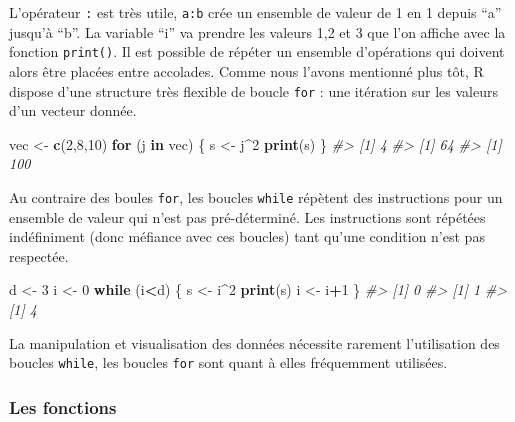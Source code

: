 \documentclass[]{article}
\newenvironment{Shaded}{\begin{snugshade}}{\end{snugshade}}
\newcommand{\CommentTok}[1]{\textcolor[rgb]{0.56,0.35,0.01}{\textit{#1}}}
\newcommand{\ControlFlowTok}[1]{\textcolor[rgb]{0.13,0.29,0.53}{\textbf{#1}}}
\newcommand{\DecValTok}[1]{\textcolor[rgb]{0.00,0.00,0.81}{#1}}
\newcommand{\KeywordTok}[1]{\textcolor[rgb]{0.13,0.29,0.53}{\textbf{#1}}}
\newcommand{\NormalTok}[1]{#1}
\newcommand{\OperatorTok}[1]{\textcolor[rgb]{0.81,0.36,0.00}{\textbf{#1}}}
\newcommand{\StringTok}[1]{\textcolor[rgb]{0.31,0.60,0.02}{#1}}
\begin{document}
L'opérateur \texttt{:} est très utile, \texttt{a:b} crée un ensemble de valeur de 1 en 1 depuis ``a'' jusqu'à ``b''. La variable ``i'' va prendre les valeurs 1,2 et 3 que l'on affiche avec la fonction \texttt{print()}. Il est possible de répéter un ensemble d'opérations qui doivent alors être placées entre accolades.
Comme nous l'avons mentionné plus tôt, R dispose d'une structure très flexible de boucle \texttt{for} : une itération sur les valeurs d'un vecteur donnée.

\begin{Shaded}
\begin{Highlighting}[]
\NormalTok{vec <-}\StringTok{ }\KeywordTok{c}\NormalTok{(}\DecValTok{2}\NormalTok{,}\DecValTok{8}\NormalTok{,}\DecValTok{10}\NormalTok{)}
\ControlFlowTok{for}\NormalTok{ (j }\ControlFlowTok{in}\NormalTok{ vec) \{}
\NormalTok{  s <-}\StringTok{ }\NormalTok{j}\OperatorTok{^}\DecValTok{2}
  \KeywordTok{print}\NormalTok{(s)}
\NormalTok{\}}
\CommentTok{#> [1] 4}
\CommentTok{#> [1] 64}
\CommentTok{#> [1] 100}
\end{Highlighting}
\end{Shaded}

Au contraire des boules \texttt{for}, les boucles \texttt{while} répètent des instructions pour un ensemble de valeur qui n'est pas pré-déterminé. Les instructions sont répétées indéfiniment (donc méfiance avec ces boucles) tant qu'une condition n'est pas respectée.

\begin{Shaded}
\begin{Highlighting}[]
\NormalTok{d <-}\StringTok{ }\DecValTok{3}
\NormalTok{i <-}\StringTok{ }\DecValTok{0}
\ControlFlowTok{while}\NormalTok{ (i}\OperatorTok{<}\NormalTok{d) \{}
\NormalTok{  s <-}\StringTok{ }\NormalTok{i}\OperatorTok{^}\DecValTok{2}
  \KeywordTok{print}\NormalTok{(s)}
\NormalTok{  i <-}\StringTok{ }\NormalTok{i}\OperatorTok{+}\DecValTok{1}
\NormalTok{\}}
\CommentTok{#> [1] 0}
\CommentTok{#> [1] 1}
\CommentTok{#> [1] 4}
\end{Highlighting}
\end{Shaded}

La manipulation et visualisation des données nécessite rarement l'utilisation des boucles \texttt{while}, les boucles \texttt{for} sont quant à elles fréquemment utilisées.

\hypertarget{les-fonctions}{%
\subsubsection{Les fonctions}\label{les-fonctions}}
\end{document}
